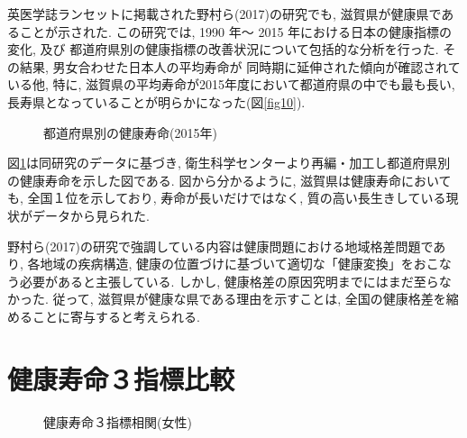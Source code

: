 英医学誌ランセットに掲載された野村ら(2017)の研究でも, 滋賀県が健康県であることが示された.
この研究では, 1990 年〜 2015 年における日本の健康指標の変化, 及び 都道府県別の健康指標の改善状況について包括的な分析を行った. その結果, 男女合わせた日本人の平均寿命が
同時期に延伸された傾向が確認されている他, 特に, 滋賀県の平均寿命が2015年度において都道府県の中でも最も長い, 長寿県となっていることが明らかになった(図\ref{fig10}).
%
%





\begin{figure}[h!]
	\begin{center}
		\caption{都道府県別の健康寿命(2015年)}\label{fig11}
	\end{center}
\end{figure}

図\ref{fig11}は同研究のデータに基づき, 衛生科学センターより再編・加工し都道府県別の健康寿命を示した図である. 図から分かるように, 滋賀県は健康寿命においても, 全国１位を示しており, 寿命が長いだけではなく, 質の高い長生きしている現状がデータから見られた.

野村ら(2017)の研究で強調している内容は健康問題における地域格差問題であり, 各地域の疾病構造, 健康の位置づけに基づいて適切な「健康変換」をおこなう必要があると主張している. しかし, 健康格差の原因究明までにはまだ至らなかった. 従って, 滋賀県が健康な県である理由を示すことは, 全国の健康格差を縮めることに寄与すると考えられる.

%

\section{健康寿命３指標比較}
\begin{figure}[h!]
	\begin{center}
		\caption{健康寿命３指標相関(女性)}
	\end{center}
\end{figure}

